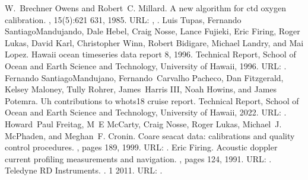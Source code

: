 \documentclass[a4paper,10pt,english,openany,oneside]{sphinxmanual}
\begin{document}
\begin{sphinxthebibliography}{10}
W. Brechner Owens and Robert C. Millard. A new algorithm for ctd oxygen calibration. , 15(5):621 \textendash{} 631, 1985. URL: , .
\sphinxAtStartPar
Luis Tupas, Fernando Santiago\sphinxhyphen{}Mandujando, Dale Hebel, Craig Nosse, Lance Fujieki, Eric Firing, Roger Lukas, David Karl, Christopher Winn, Robert Bidigare, Michael Landry, and Mai Lopez. Hawaii ocean time\sphinxhyphen{}series data report 8, 1996. Technical Report, School of Ocean and Earth Science and Technology, University of Hawaii, 1996. URL: .
\sphinxAtStartPar
Fernando Santiago\sphinxhyphen{}Mandujano, Fernando Carvalho Pacheco, Dan Fitzgerald, Kelsey Maloney, Tully Rohrer, James Harris III, Noah Howins, and James Potemra. Uh contributions to whots\sphinxhyphen{}18 cruise report. Technical Report, School of Ocean and Earth Science and Technology, University of Hawaii, 2022. URL: .
\sphinxAtStartPar
Howard Paul Freitag, M E McCarty, Craig Nosse, Roger Lukas, Michael J. McPhaden, and Meghan F. Cronin. Coare seacat data: calibrations and quality control procedures. , pages 1\textendash{}89, 1999. URL: .
\sphinxAtStartPar
Eric Firing. Acoustic doppler current profiling measurements and navigation. , pages 1\textendash{}24, 1991. URL: .
\sphinxAtStartPar
Teledyne RD Instruments. . 1 2011. URL: .

\end{sphinxthebibliography}
\end{document}
